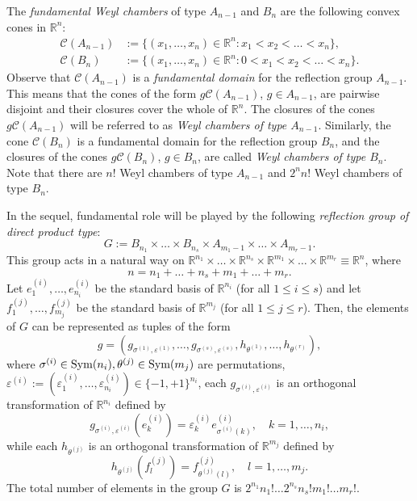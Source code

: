 \documentclass[12pt, reqno]{amsart}
\theoremstyle{plain}
\theoremstyle{definition}
\theoremstyle{remark}
\begin{document}
The {\it fundamental Weyl chambers} of type $A_{n-1}$ and $B_n$ are the following convex cones in ${\mathbb{R}}^n$:
\begin{align*}
{\mathcal{C}}(A_{n-1}) &:=\{(x_1,\ldots,x_{n})\in {\mathbb{R}}^n \colon x_1<x_2<\ldots < x_{n}\},\\
{\mathcal{C}}(B_n) &:= \{(x_1,\ldots,x_n)\in{\mathbb{R}}^n\colon 0< x_1<x_2<\ldots < x_n\}.
\end{align*}
Observe that ${\mathcal{C}}(A_{n-1})$ is a {\it fundamental domain} for the reflection group $A_{n-1}$. This means that the cones of the form $g{\mathcal{C}}(A_{n-1})$, $g \in A_{n-1}$, are pairwise disjoint and their closures cover the whole of ${\mathbb{R}}^n$. The closures of the cones $g{\mathcal{C}}(A_{n-1})$ will be referred to as \emph{Weyl chambers of type $A_{n-1}$}. Similarly, the cone ${\mathcal{C}}(B_n)$ is a fundamental domain for the reflection group $B_n$, and the closures of the cones $g{\mathcal{C}}(B_n)$, $g\in B_n$, are called \emph{Weyl chambers of type $B_n$}. Note that there are $n!$ Weyl chambers of type $A_{n-1}$ and $2^n n!$ Weyl chambers of type $B_n$.

In the sequel, fundamental role will be played by the following \emph{reflection group of  direct product type}:
$$
G := B_{n_1} \times \ldots \times B_{n_s}\times A_{m_1-1} \times \ldots \times A_{m_r-1}.
$$
This group acts  in a natural way on ${\mathbb{R}}^{n_1}\times \ldots \times {\mathbb{R}}^{n_s}\times {\mathbb{R}}^{m_1}\times \ldots \times {\mathbb{R}}^{m_r} \equiv {\mathbb{R}}^n$,  where
$$
n=n_1+\ldots+n_s+m_1+\ldots+m_r.
$$
Let  $e_1^{(i)},\ldots, e_{n_i}^{(i)}$ be the standard basis of ${\mathbb{R}}^{n_i}$ (for all $1\leq i\leq s$) and let $f_1^{(j)},\ldots, f_{m_j}^{(j)}$ be the standard basis of ${\mathbb{R}}^{m_j}$ (for all $1\leq j\leq r$). Then, the elements of $G$ can be represented as tuples of the form
\begin{equation}\label{eq:g_def}
g=(g_{\sigma^{(1)}, {\varepsilon}^{(1)}}, \ldots, g_{\sigma^{(s)}, {\varepsilon}^{(s)}},h_{\theta^{(1)}}, \ldots, h_{\theta^{(r)}}),
\end{equation}
where $\sigma^{(i)}\in {\text{\rm Sym}}(n_i),\theta^{(j)}\in {\text{\rm Sym}}(m_j)$ are permutations, ${\varepsilon}^{(i)}:=({\varepsilon}_1^{(i)},\ldots,{\varepsilon}_{n_i}^{(i)})\in \{-1,+1\}^{n_i}$,  each $g_{\sigma^{(i)}, {\varepsilon}^{(i)}}$ is an orthogonal transformation of ${\mathbb{R}}^{n_i}$ defined by
\begin{equation}\label{eq:g_def1}
g_{\sigma^{(i)},{\varepsilon}^{(i)}} (e_k^{(i)}) = {\varepsilon}_k^{(i)} e_{\sigma^{(i)}(k)}^{(i)}, \quad k=1,\ldots,n_i,
\end{equation}
while each $h_{\theta^{(j)}}$ is an orthogonal transformation of ${\mathbb{R}}^{m_j}$ defined by
\begin{equation}\label{eq:g_def2}
h_{\theta^{(j)}} (f_l^{(j)}) = f_{\theta^{(j)}(l)}^{(j)}, \quad l=1,\ldots,m_j.
\end{equation}
The total number of elements in the group  $G$ is $2^{n_1} n_1!\ldots 2^{n_s} n_s!m_1!\ldots  m_r!$.
\end{document}
